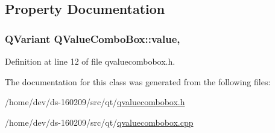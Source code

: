 \subsection{Property Documentation}
\hypertarget{class_q_value_combo_box_ac487ee6027e1b8b7c211f95d60c45f7c}{}
\subsubsection[{value}]{\setlength{\rightskip}{0pt plus 5cm}Q\+Variant Q\+Value\+Combo\+Box\+::value\hspace{0.3cm}{\ttfamily [read]}, {\ttfamily [write]}}\label{class_q_value_combo_box_ac487ee6027e1b8b7c211f95d60c45f7c}


Definition at line 12 of file qvaluecombobox.\+h.



The documentation for this class was generated from the following files\+:\begin{DoxyCompactItemize}
\item 
/home/dev/ds-\/160209/src/qt/\hyperlink{qvaluecombobox_8h}{qvaluecombobox.\+h}\item 
/home/dev/ds-\/160209/src/qt/\hyperlink{qvaluecombobox_8cpp}{qvaluecombobox.\+cpp}\end{DoxyCompactItemize}
